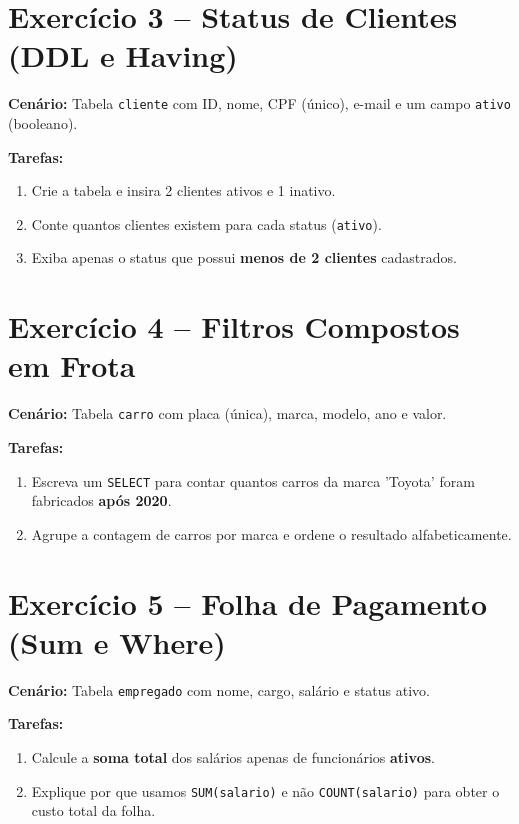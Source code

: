 \documentclass[12pt]{article}
\begin{document}
\hrulefill

\section*{Exercício 3 – Status de Clientes (DDL e Having)}



\textbf{Cenário:} Tabela \texttt{cliente} com ID, nome, CPF (único), e-mail e um campo \texttt{ativo} (booleano).

\textbf{Tarefas:}
\begin{enumerate}
    \item Crie a tabela e insira 2 clientes ativos e 1 inativo.
    \item Conte quantos clientes existem para cada status (\texttt{ativo}).
    \item Exiba apenas o status que possui \textbf{menos de 2 clientes} cadastrados.
\end{enumerate}

\hrulefill

\section*{Exercício 4 – Filtros Compostos em Frota}



\textbf{Cenário:} Tabela \texttt{carro} com placa (única), marca, modelo, ano e valor.

\textbf{Tarefas:}
\begin{enumerate}
    \item Escreva um \texttt{SELECT} para contar quantos carros da marca 'Toyota' foram fabricados \textbf{após 2020}.
    \item Agrupe a contagem de carros por marca e ordene o resultado alfabeticamente.
\end{enumerate}

\hrulefill

\section*{Exercício 5 – Folha de Pagamento (Sum e Where)}



\textbf{Cenário:} Tabela \texttt{empregado} com nome, cargo, salário e status ativo.

\textbf{Tarefas:}
\begin{enumerate}
    \item Calcule a \textbf{soma total} dos salários apenas de funcionários \textbf{ativos}.
    \item Explique por que usamos \texttt{SUM(salario)} e não \texttt{COUNT(salario)} para obter o custo total da folha.
\end{enumerate}
\end{document}
